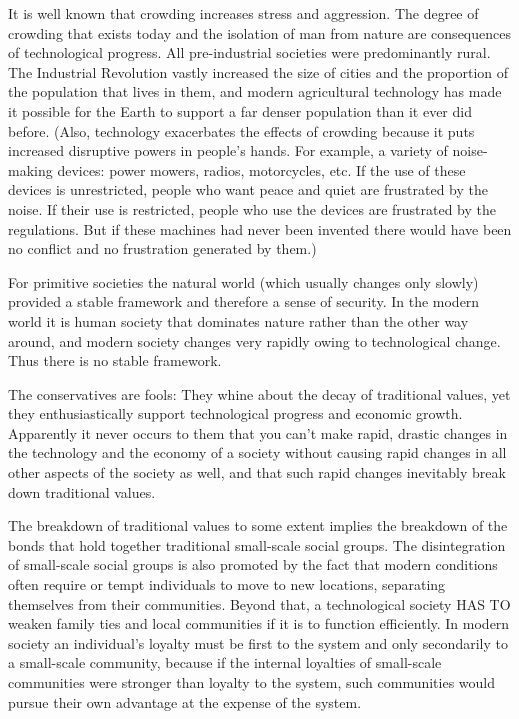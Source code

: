  It is well known that crowding increases stress and aggression. The degree of crowding that exists today and the isolation of man from nature are consequences of technological progress. All pre-industrial societies were predominantly rural. The Industrial Revolution vastly increased the size of cities and the proportion of the population that lives in them, and modern agricultural technology has made it possible for the Earth to support a far denser population than it ever did before. (Also, technology exacerbates the effects of crowding because it puts increased disruptive powers in people’s hands. For example, a variety of noise- making devices: power mowers, radios, motorcycles, etc. If the use of these devices is unrestricted, people who want peace and quiet are frustrated by the noise. If their use is restricted, people who use the devices are frustrated by the regulations. But if these machines had never been invented there would have been no conflict and no frustration generated by them.)

 For primitive societies the natural world (which usually changes only slowly) provided a stable framework and therefore a sense of security. In the modern world it is human society that dominates nature rather than the other way around, and modern society changes very rapidly owing to technological change. Thus there is no stable framework.

 The conservatives are fools: They whine about the decay of traditional values, yet they enthusiastically support technological progress and economic growth. Apparently it never occurs to them that you can’t make rapid, drastic changes in the technology and the economy of a society without causing rapid changes in all other aspects of the society as well, and that such rapid changes inevitably break down traditional values.

 The breakdown of traditional values to some extent implies the breakdown of the bonds that hold together traditional small-scale social groups. The disintegration of small-scale social groups is also promoted by the fact that modern conditions often require or tempt individuals to move to new locations, separating themselves from their communities. Beyond that, a technological society HAS TO weaken family ties and local communities if it is to function efficiently. In modern society an individual’s loyalty must be first to the system and only secondarily to a small-scale community, because if the internal loyalties of small-scale communities were stronger than loyalty to the system, such communities would pursue their own advantage at the expense of the system.

